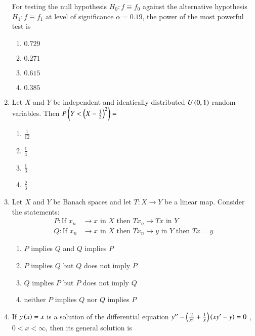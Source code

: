 \documentclass[journal,onecolumn]{IEEEtran}
\theoremstyle{remark}
\begin{document}
\begin{enumerate}
	For testing the null hypothesis $H_0 \colon f \equiv f_0$ against the alternative hypothesis $H_1\colon f \equiv f_1$ at level of significance $\alpha = 0.19$, the power of the most powerful test is

	\begin{enumerate}
		\item $0.729$ 
		\item $0.271$ 
		\item $0.615$ 
		\item $0.385$ 
	\end{enumerate}


    \item Let $X$ and $Y$ be independent and identically distributed $U\left(0,1\right)$ random variables. Then $P\left(Y < \left(X - \frac{1}{2}\right)^2\right) = $

	\begin{enumerate}
		\item $\frac{1}{12}$
		\item $\frac{1}{4}$
		\item $\frac{1}{3}$
		\item $\frac{2}{3}$
	\end{enumerate}


    \item Let $X$ and $Y$ be Banach spaces and let $T\colon X \to Y$ be a linear map. Consider the statements:
	\begin{align*}
		P\colon \text{If } x_n &\to x \text{ in } X \text{ then } Tx_n \to Tx \text{ in } Y\\
		Q\colon \text{If } x_n &\to x \text{ in } X \text{ then } Tx_n \to y \text{ in } Y \text{ then } Tx = y
	\end{align*}

	\begin{enumerate}
		\item $P$ implies $Q$ and $Q$ implies $P$
		\item $P$ implies $Q$ but $Q$ does not imply $P$
		\item $Q$ implies $P$ but $P$ does not imply $Q$
		\item neither $P$ implies $Q$ nor $Q$ implies $P$
	\end{enumerate}


    \item If $y\left(x\right) = x$ is a solution of the differential equation $y^{\prime\prime} - \left(\frac{2}{x^2}+\frac{1}{x}\right)\left(xy^{\prime} - y\right) = 0$ , $0<x<\infty$, then its general solution is


\end{enumerate}
\end{document}
